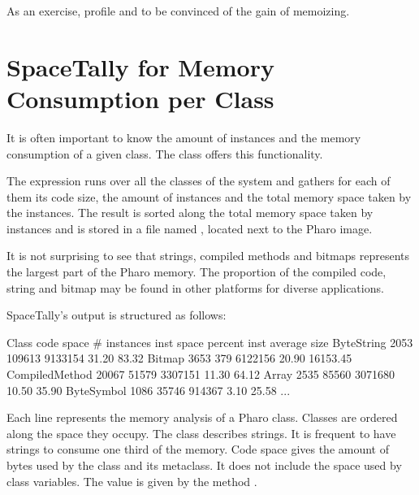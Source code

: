 \documentclass[a4paper,10pt,twoside]{book}
\begin{document}

As an exercise, profile  and  to be convinced of the gain of memoizing. 

\section{SpaceTally for Memory Consumption per Class}

It is often important to know the amount of instances and the memory consumption of a given class. The class  offers this functionality. 

The expression  runs over all the classes of the system and gathers for each of them its code size, the amount of instances and the total memory space taken by the instances. The result is sorted along the total memory space taken by instances and is stored in a file named , located next to the Pharo image.

It is not surprising to see that strings, compiled methods and bitmaps represents the largest part of the Pharo memory. The proportion of the compiled code, string and bitmap may be found in other platforms for diverse applications.

SpaceTally's output is structured as follows:

\begin{code}{}
Class                            code space # instances  inst space     percent   inst average size
ByteString                           2053      109613        9133154       31.20               83.32
Bitmap                                 3653            379       6122156       20.90          16153.45
CompiledMethod                 20067      51579       3307151       11.30                64.12
Array                                   2535         85560       3071680      10.50                 35.90
ByteSymbol                        1086         35746         914367        3.10                 25.58
...
\end{code}

Each line represents the memory analysis of a Pharo class. Classes are ordered along the space they occupy. The class  describes strings. It is frequent to have strings to consume one third of the memory.
Code space gives the amount of bytes used by the class and its metaclass. It does not include the space used by class variables. The value is given by the method . 
\end{document}
